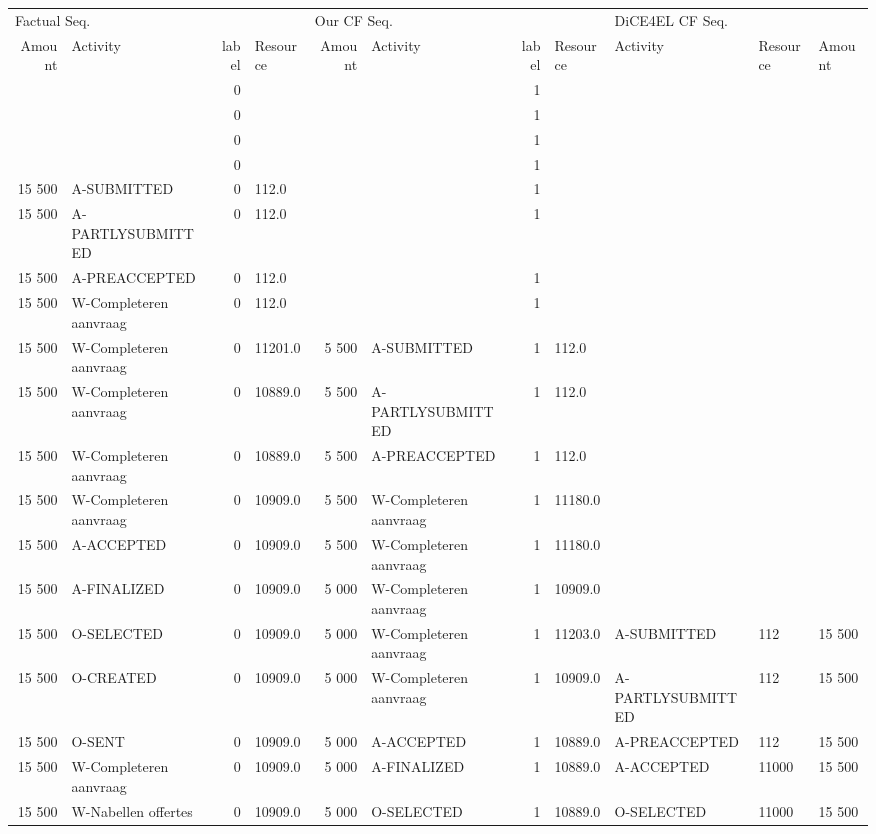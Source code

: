 \begin{tabular}{rlrlrlrllll}
\toprule
\multicolumn{4}{l}{Factual Seq.} & \multicolumn{4}{l}{Our CF Seq.} & \multicolumn{3}{l}{DiCE4EL CF Seq.} \\
Amount & Activity & label & Resource & Amount & Activity & label & Resource & Activity & Resource & Amount \\
\midrule
 &  & 0 &  &  &  & 1 &  &  &  &  \\
 &  & 0 &  &  &  & 1 &  &  &  &  \\
 &  & 0 &  &  &  & 1 &  &  &  &  \\
 &  & 0 &  &  &  & 1 &  &  &  &  \\
15 500 & A-SUBMITTED & 0 & 112.0 &  &  & 1 &  &  &  &  \\
15 500 & A-PARTLYSUBMITTED & 0 & 112.0 &  &  & 1 &  &  &  &  \\
15 500 & A-PREACCEPTED & 0 & 112.0 &  &  & 1 &  &  &  &  \\
15 500 & W-Completeren aanvraag & 0 & 112.0 &  &  & 1 &  &  &  &  \\
15 500 & W-Completeren aanvraag & 0 & 11201.0 & 5 500 & A-SUBMITTED & 1 & 112.0 &  &  &  \\
15 500 & W-Completeren aanvraag & 0 & 10889.0 & 5 500 & A-PARTLYSUBMITTED & 1 & 112.0 &  &  &  \\
15 500 & W-Completeren aanvraag & 0 & 10889.0 & 5 500 & A-PREACCEPTED & 1 & 112.0 &  &  &  \\
15 500 & W-Completeren aanvraag & 0 & 10909.0 & 5 500 & W-Completeren aanvraag & 1 & 11180.0 &  &  &  \\
15 500 & A-ACCEPTED & 0 & 10909.0 & 5 500 & W-Completeren aanvraag & 1 & 11180.0 &  &  &  \\
15 500 & A-FINALIZED & 0 & 10909.0 & 5 000 & W-Completeren aanvraag & 1 & 10909.0 &  &  &  \\
15 500 & O-SELECTED & 0 & 10909.0 & 5 000 & W-Completeren aanvraag & 1 & 11203.0 & A-SUBMITTED & 112 & 15 500 \\
15 500 & O-CREATED & 0 & 10909.0 & 5 000 & W-Completeren aanvraag & 1 & 10909.0 & A-PARTLYSUBMITTED & 112 & 15 500 \\
15 500 & O-SENT & 0 & 10909.0 & 5 000 & A-ACCEPTED & 1 & 10889.0 & A-PREACCEPTED & 112 & 15 500 \\
15 500 & W-Completeren aanvraag & 0 & 10909.0 & 5 000 & A-FINALIZED & 1 & 10889.0 & A-ACCEPTED & 11000 & 15 500 \\
15 500 & W-Nabellen offertes & 0 & 10909.0 & 5 000 & O-SELECTED & 1 & 10889.0 & O-SELECTED & 11000 & 15 500 \\

\end{tabular}
